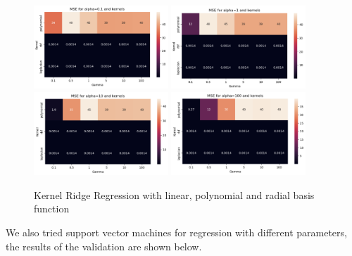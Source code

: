 \documentclass[12pt]{article}
\begin{document}
\begin{figure}[h]
    \centering
    \includegraphics[width=0.45\textwidth]{kernel_0.1}
    \includegraphics[width=0.45\textwidth]{kernel_1}
    \includegraphics[width=0.45\textwidth]{kernel_10}
    \includegraphics[width=0.45\textwidth]{kernel_100}
    \caption{Kernel Ridge Regression with linear, polynomial and radial basis function}
    \label{fig:kernel_ridge_regression}
\end{figure}

We also tried support vector machines for regression with different parameters,
the results of the validation are shown below.
\end{document}
